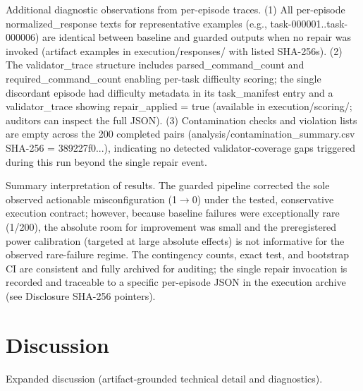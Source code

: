 \documentclass[conference]{IEEEtran}
\begin{document}
Additional diagnostic observations from per-episode traces. (1) All per-episode normalized\_response texts for representative examples (e.g., task-000001..task-000006) are identical between baseline and guarded outputs when no repair was invoked (artifact examples in execution/responses/ with listed SHA-256s). (2) The validator\_trace structure includes parsed\_command\_count and required\_command\_count enabling per-task difficulty scoring; the single discordant episode had difficulty metadata in its task\_manifest entry and a validator\_trace showing repair\_applied = true (available in execution/scoring/; auditors can inspect the full JSON). (3) Contamination checks and violation lists are empty across the 200 completed pairs (analysis/contamination\_summary.csv SHA-256 = 389227f0...), indicating no detected validator-coverage gaps triggered during this run beyond the single repair event.

Summary interpretation of results. The guarded pipeline corrected the sole observed actionable misconfiguration (1\ensuremath{\rightarrow}0) under the tested, conservative execution contract; however, because baseline failures were exceptionally rare (1/200), the absolute room for improvement was small and the preregistered power calibration (targeted at large absolute effects) is not informative for the observed rare-failure regime. The contingency counts, exact test, and bootstrap CI are consistent and fully archived for auditing; the single repair invocation is recorded and traceable to a specific per-episode JSON in the execution archive (see Disclosure SHA-256 pointers).

\section{Discussion}
Expanded discussion (artifact-grounded technical detail and diagnostics).
\end{document}
